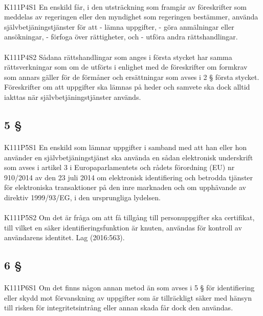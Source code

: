 \documentclass[a4paper,notitlepage,openany,10pt]{book}
\begin{document}
\paragraph*{}
{\tiny K111P4S1}
En enskild får, i den utsträckning som framgår av föreskrifter som meddelas av regeringen eller den myndighet som regeringen bestämmer, använda självbetjäningstjänster för att
\newline - lämna uppgifter,
\newline - göra anmälningar eller ansökningar,
\newline - förfoga över rättigheter, och
\newline - utföra andra rättshandlingar.
\paragraph*{}
{\tiny K111P4S2}
Sådana rättshandlingar som anges i första stycket har samma rättsverkningar som om de utförts i enlighet med de föreskrifter om formkrav som annars gäller för de förmåner och ersättningar som avses i 2 § första stycket. Föreskrifter om att uppgifter ska lämnas på heder och samvete ska dock alltid iakttas när självbetjäningstjänster används.
\subsection*{5 §}
\paragraph*{}
{\tiny K111P5S1}
En enskild som lämnar uppgifter i samband med att han eller hon använder en självbetjäningstjänst ska använda en sådan elektronisk underskrift som avses i artikel 3 i Europaparlamentets och rådets förordning (EU) nr 910/2014 av den 23 juli 2014 om elektronisk identifiering och betrodda tjänster för elektroniska transaktioner på den inre marknaden och om upphävande av direktiv 1999/93/EG, i den ursprungliga lydelsen.
\paragraph*{}
{\tiny K111P5S2}
Om det är fråga om att få tillgång till personuppgifter ska certifikat, till vilket en säker identifieringsfunktion är knuten, användas för kontroll av användarens identitet.
Lag (2016:563).
\subsection*{6 §}
\paragraph*{}
{\tiny K111P6S1}
Om det finns någon annan metod än som avses i 5 § för identifiering eller skydd mot förvanskning av uppgifter som är tillräckligt säker med hänsyn till risken för integritetsintrång eller annan skada får dock den användas.
\end{document}
